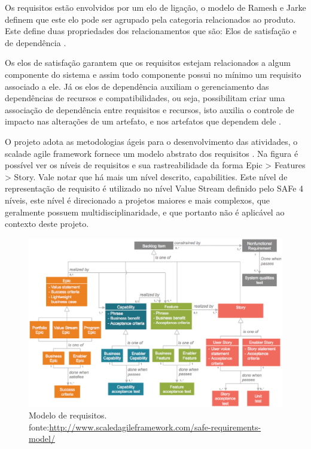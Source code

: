 Os requisitos estão envolvidos por um elo de ligação, o modelo de Ramesh e Jarke definem que este elo pode ser agrupado pela categoria relacionados ao produto. Este define duas propriedades dos relacionamentos que são: Elos de satisfação e de dependência \cite{leite2005}.

Os elos de satisfação garantem que os requisitos estejam relacionados a algum componente do sistema e assim todo componente possui no mínimo um requisito associado a ele. Já os elos de dependência auxiliam o gerenciamento das dependências de recursos e compatibilidades, ou seja, possibilitam criar uma associação de dependência entre requisitos e recursos, isto auxilia o controle de impacto nas alterações de um artefato, e nos artefatos que dependem dele \cite{leite2005}.

O projeto adota as metodologias ágeis para o desenvolvimento das atividades, o scalade agile framework fornece um modelo abstrato dos requisitos \cite{safe}. Na figura é possível ver os níveis de requisitos e sua rastreabilidade da forma Epic > Features > Story. Vale notar que há mais um nível descrito, capabilities. Este nível de representação de requisito é utilizado no nível Value Stream definido pelo SAFe 4 níveis, este nível é direcionado a projetos maiores e mais complexos, que geralmente possuem multidisciplinaridade, e que portanto não é aplicável ao contexto deste projeto.

\begin{figure}[H]
    \centering
    \caption{Modelo de requisitos. fonte:\url{http://www.scaledagileframework.com/safe-requirements-model/}}
    \label{modeloRequisitos}
    \includegraphics[keepaspectratio=true,scale=0.5]{figuras/modeloRequisitos.eps}
\end{figure}


